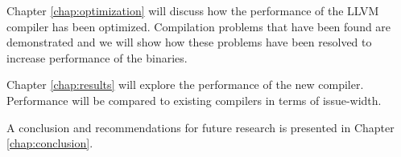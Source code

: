 Chapter \ref{chap:optimization} will discuss how the performance of the LLVM compiler has been optimized. Compilation problems that have been found are demonstrated and we will show how these problems have been resolved to increase performance of the binaries.

Chapter \ref{chap:results} will explore the performance of the new compiler. Performance will be compared to existing compilers in terms of issue-width. 

A conclusion and recommendations for future research is presented in Chapter \ref{chap:conclusion}.  


\acresetall

